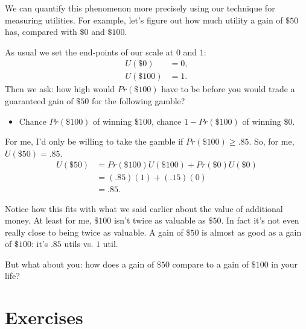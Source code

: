 \documentclass[justified]{tufte-book}
\providecommand{\tightlist}{%
  \setlength{\itemsep}{0pt}\setlength{\parskip}{0pt}}
\renewcommand{\u}{U}
\newcommand{\p}{Pr}
\theoremstyle{definition}
\theoremstyle{definition}
\theoremstyle{definition}
\theoremstyle{remark}
\begin{document}
We can quantify this phenomenon more precisely using our technique for
measuring utilities. For example, let's figure out how much utility a
gain of \(\$50\) has, compared with \(\$0\) and \(\$100\).

As usual we set the end-points of our scale at \(0\) and \(1\): \[
  \begin{aligned}
    \u(\$0)   &= 0,\\
    \u(\$100) &= 1.
  \end{aligned}
\] Then we ask: how high would \(\p(\$100)\) have to be before you would
trade a guaranteed gain of \(\$50\) for the following gamble?

\begin{itemize}
\tightlist
\item
  Chance \(\p(\$100)\) of winning \(\$100\), chance \(1-\p(\$100)\) of
  winning \(\$0\).
\end{itemize}

For me, I'd only be willing to take the gamble if
\(\p(\$100) \geq .85\). So, for me, \(\u(\$50) = .85\). \[
  \begin{aligned}
    \u(\$50) &= \p(\$100)\u(\$100) + \p(\$0)\u(\$0)\\
             &= (.85)(1) + (.15)(0)\\
             &= .85.
  \end{aligned}
\]

Notice how this fits with what we said earlier about the value of
additional money. At least for me, \(\$100\) isn't twice as valuable as
\(\$50\). In fact it's not even really close to being twice as valuable.
A gain of \(\$50\) is almost as good as a gain of \(\$100\): it's
\(.85\) utils vs. \(1\) util.

But what about you: how does a gain of \(\$50\) compare to a gain of
\(\$100\) in your life?

\hypertarget{exercises-9}{%
\section*{Exercises}\label{exercises-9}}
\end{document}
